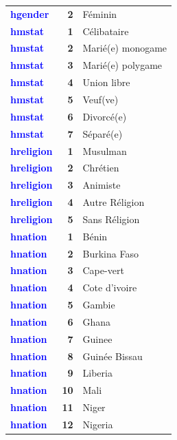 \documentclass[
]{article}
\begin{document}
\begin{longtable}[t]{>{}l>{}r>{\raggedright\arraybackslash}p{8cm}}
\textcolor{blue}{\textbf{hgender}} & \textbf{2} & Féminin\\
\textcolor{blue}{\textbf{hmstat}} & \textbf{1} & Célibataire\\
\addlinespace
\textcolor{blue}{\textbf{hmstat}} & \textbf{2} & Marié(e) monogame\\
\textcolor{blue}{\textbf{hmstat}} & \textbf{3} & Marié(e) polygame\\
\textcolor{blue}{\textbf{hmstat}} & \textbf{4} & Union libre\\
\textcolor{blue}{\textbf{hmstat}} & \textbf{5} & Veuf(ve)\\
\textcolor{blue}{\textbf{hmstat}} & \textbf{6} & Divorcé(e)\\
\addlinespace
\textcolor{blue}{\textbf{hmstat}} & \textbf{7} & Séparé(e)\\
\textcolor{blue}{\textbf{hreligion}} & \textbf{1} & Musulman\\
\textcolor{blue}{\textbf{hreligion}} & \textbf{2} & Chrétien\\
\textcolor{blue}{\textbf{hreligion}} & \textbf{3} & Animiste\\
\textcolor{blue}{\textbf{hreligion}} & \textbf{4} & Autre Réligion\\
\addlinespace
\textcolor{blue}{\textbf{hreligion}} & \textbf{5} & Sans Réligion\\
\textcolor{blue}{\textbf{hnation}} & \textbf{1} & Bénin\\
\textcolor{blue}{\textbf{hnation}} & \textbf{2} & Burkina Faso\\
\textcolor{blue}{\textbf{hnation}} & \textbf{3} & Cape-vert\\
\textcolor{blue}{\textbf{hnation}} & \textbf{4} & Cote d'ivoire\\
\addlinespace
\textcolor{blue}{\textbf{hnation}} & \textbf{5} & Gambie\\
\textcolor{blue}{\textbf{hnation}} & \textbf{6} & Ghana\\
\textcolor{blue}{\textbf{hnation}} & \textbf{7} & Guinee\\
\textcolor{blue}{\textbf{hnation}} & \textbf{8} & Guinée Bissau\\
\textcolor{blue}{\textbf{hnation}} & \textbf{9} & Liberia\\
\addlinespace
\textcolor{blue}{\textbf{hnation}} & \textbf{10} & Mali\\
\textcolor{blue}{\textbf{hnation}} & \textbf{11} & Niger\\
\textcolor{blue}{\textbf{hnation}} & \textbf{12} & Nigeria\\

\end{longtable}
\end{document}

